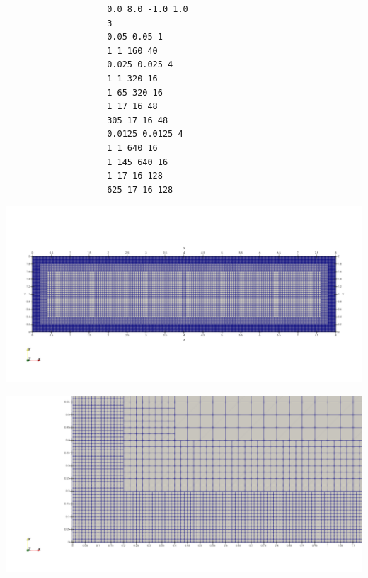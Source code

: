 \documentclass[../main/main.tex]{subfiles}
\begin{document}
\begin{frame}[fragile]{}
	\vspace{-1.5cm}
	\begin{center}
		\begin{minipage}{0.30\textwidth}
			{\footnotesize
				\begin{verbatim}
					0.0 8.0 -1.0 1.0
					3
					0.05 0.05 1
					1 1 160 40
					0.025 0.025 4
					1 1 320 16
					1 65 320 16
					1 17 16 48
					305 17 16 48
					0.0125 0.0125 4
					1 1 640 16
					1 145 640 16
					1 17 16 128
					625 17 16 128
				\end{verbatim}
			}
		\end{minipage}
		\hfill
		\begin{minipage}{0.65\textwidth}
			\includegraphics[width=\textwidth]{imgs/ref3.png}
			
			\includegraphics[height=0.35\textheight]{imgs/ref3_border.png}
		\end{minipage}
	\end{center}
\end{frame}
\end{document}
